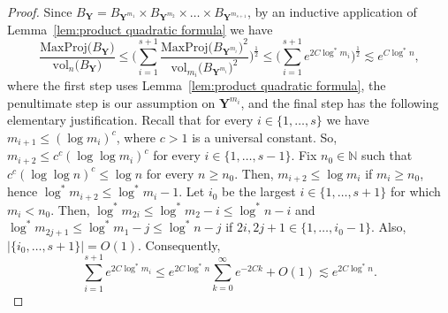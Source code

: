 \documentclass[11pt,reqno]{amsart}
\renewcommand{\le}{\leqslant}
\renewcommand{\ge}{\geqslant}
\newcommand{\Y}{\mathbf Y}
\theoremstyle{remark}
\newcommand{\N}{\mathbb N}
\newcommand{\vol}{\mathrm{vol}}
\renewcommand{\1}{\mathbf 1}
\begin{document}
\begin{proof}
Since $B_\Y= B_{\Y^{m_1}}\times B_{\Y^{m_2}}\times \ldots\times B_{\Y^{m_{s+1}}}$, by an inductive application of Lemma~\ref{lem:product quadratic formula} we have
$$
\frac{\mathrm{MaxProj} \big(B_{\Y}\big)}{\vol_{n}\big(B_{\Y}\big)} \le \Bigg(\sum_{i=1}^{s+1} \frac{\mathrm{MaxProj} \big(B_{\Y^{m_{i}}}\big)^2}{\vol_{m_i}\big(B_{\Y^{m_i}}\big)^2}\Bigg)^{\frac12}\le \bigg(\sum_{i=1}^{s+1} e^{2C\log^*\!\! m_i}\bigg)^{\frac12}\lesssim e^{C\log^*\!\! n},
$$
where the first step uses Lemma~\ref{lem:product quadratic formula}, the penultimate step is our assumption on $\Y^{m_i}$, and the final step has the following elementary justification. Recall that for every $i\in \{1,\ldots,s\}$ we have  $m_{i+1}\le (\log m_i)^c$, where $c>1 $ is a universal constant. So, $m_{i+2}\le c^c(\log\log m_i)^c$ for every $i\in \{1,\ldots,s-1\}$. Fix $n_0\in \N$ such that $c^c(\log\log n)^c\le \log n$ for every $n\ge n_0$. Then, $m_{i+2}\le \log m_i$ if $m_i\ge n_0$, hence $\log^*\!\! m_{i+2}\le \log^*\!\! m_i-1$. Let $i_0$ be the largest $i\in \{1,\ldots,s+1\}$ for which $m_i<n_0$. Then,   $\log^*\!\! m_{2i}\le \log^*\!\! m_2-i\le \log^*\!\! n-i$ and $\log^*\!\! m_{2j+1}\le \log^*\!\! m_1-j\le \log^*\!\! n-j$ if $2i, 2j+1\in \{1,\ldots,i_0-1\}$. Also, $|\{i_0,\ldots,s+1\}|=O(1)$. Consequently,
\begin{equation*}
\sum_{i=1}^{s+1} e^{2C\log^*\!\! m_i}\le e^{2C\log^*\!\! n}\sum_{k=0}^\infty e^{-2Ck}+O(1)\lesssim e^{2C\log^*\!\! n}. \tag*{\qedhere}
\end{equation*}
\end{proof}
\end{document}

